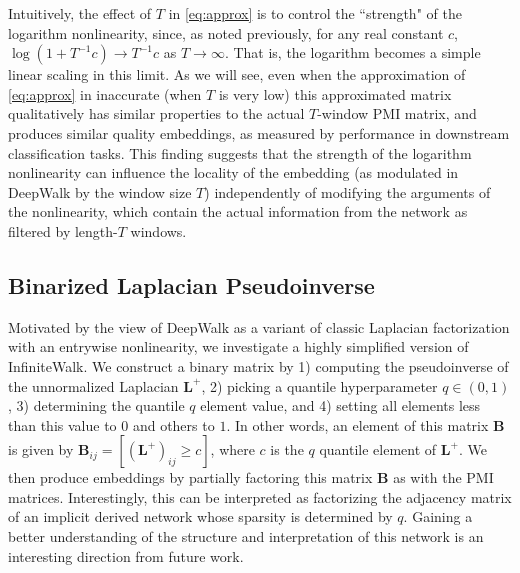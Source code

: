 \documentclass[sigconf]{acmart}
\newcommand{\mbf}[1]{\mathbf{#1}}
\newcommand{\bv}[1]{\mathbf{#1}}
\begin{document}
Intuitively, the effect of $T$ in \eqref{eq:approx} is to control the ``strength" of the logarithm nonlinearity, since, as noted previously, for any real constant $c$, $\log(1 + T^{-1}c) \to T^{-1}c$ as $T \to \infty$. That is, the logarithm becomes a simple linear scaling in this limit. As we will see, even when the approximation of \eqref{eq:approx} in inaccurate (when $T$ is very low) this approximated matrix qualitatively has similar properties to the actual $T$-window PMI matrix, and produces similar quality embeddings, as measured by performance in downstream classification tasks. This finding suggests that the strength of the logarithm nonlinearity can influence the locality of the embedding (as modulated in DeepWalk by the window size $T$) independently of modifying the arguments of the nonlinearity, which contain the actual information from the network as filtered by length-$T$ windows.

\subsection{Binarized Laplacian Pseudoinverse}\label{sec:binary}

Motivated by the view of DeepWalk as a variant of classic Laplacian factorization with an entrywise nonlinearity, we investigate a highly simplified version of InfiniteWalk. %
We construct a binary matrix by 1) computing the pseudoinverse of the unnormalized Laplacian $\bv{L}^+$, 2) picking a quantile hyperparameter $q \in (0,1)$, 3) determining the quantile $q$ element value, and 4) setting all elements less than this value to $0$ and others to $1$. In other words, an element of this matrix $\mbf{B}$ is given by $\mbf{B}_{ij} = [(\mbf{L}^+)_{ij} \geq c]$, where $c$ is the $q$ quantile element of $\mbf{L}^+$. We then produce embeddings by partially factoring this matrix $\mbf{B}$ as with the PMI matrices. Interestingly, this can be interpreted as factorizing the adjacency matrix of an implicit derived network whose sparsity is determined by $q$. Gaining a better understanding of the structure and interpretation of this network is an interesting direction from future work.
\end{document}

